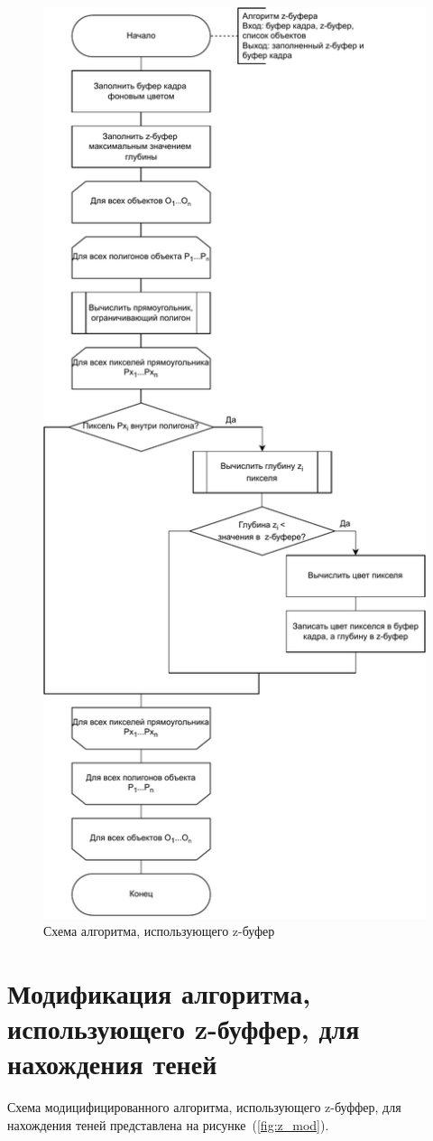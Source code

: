 \begin{figure}[h!]
	\centering
	\includegraphics[width=0.65\linewidth]{img/z}
	\caption{Схема алгоритма, использующего z-буфер}
	\label{fig:z}
\end{figure}
\clearpage

\section[Модификация алгоритма, использующего z-буффер, для нахождения теней]{Модификация алгоритма,\\использующего z-буффер, для\\нахождения теней}

Схема модицифицированного алгоритма, использующего z-буффер, для нахождения теней представлена на рисунке~(\ref{fig:z_mod}).

